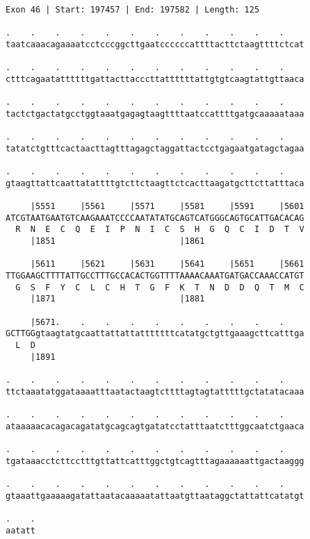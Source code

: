\documentclass{article}
\begin{document}
\begin{Verbatim}
Exon 46 | Start: 197457 | End: 197582 | Length: 125
 
.    .    .    .    .    .    .    .    .    .    .    .    
taatcaaacagaaaatcctcccggcttgaatccccccattttacttctaagttttctcat
  
.    .    .    .    .    .    .    .    .    .    .    .    
ctttcagaatattttttgattacttacccttattttttattgtgtcaagtattgttaaca
  
.    .    .    .    .    .    .    .    .    .    .    .    
tactctgactatgcctggtaaatgagagtaagttttaatccattttgatgcaaaaataaa
  
.    .    .    .    .    .    .    .    .    .    .    .    
tatatctgtttcactaacttagtttagagctaggattactcctgagaatgatagctagaa
  
.    .    .    .    .    .    .    .    .    .    .    .    
gtaagttattcaattatattttgtcttctaagttctcacttaagatgcttcttatttaca
  
     |5551     |5561     |5571     |5581     |5591     |5601
ATCGTAATGAATGTCAAGAAATCCCCAATATATGCAGTCATGGGCAGTGCATTGACACAG
  R  N  E  C  Q  E  I  P  N  I  C  S  H  G  Q  C  I  D  T  V
     |1851                         |1861                    
  
     |5611     |5621     |5631     |5641     |5651     |5661
TTGGAAGCTTTTATTGCCTTTGCCACACTGGTTTTAAAACAAATGATGACCAAACCATGT
  G  S  F  Y  C  L  C  H  T  G  F  K  T  N  D  D  Q  T  M  C
     |1871                         |1881                    
  
     |5671.    .    .    .    .    .    .    .    .    .    
GCTTGGgtaagtatgcaattattattatttttttcatatgctgttgaaagcttcatttga
  L  D                                                      
     |1891                                                  
  
.    .    .    .    .    .    .    .    .    .    .    .    
ttctaaatatggataaaatttaatactaagtcttttagtagtatttttgctatatacaaa
  
.    .    .    .    .    .    .    .    .    .    .    .    
ataaaaacacagacagatatgcagcagtgatatcctatttaatctttggcaatctgaaca
  
.    .    .    .    .    .    .    .    .    .    .    .    
tgataaacctcttcctttgttattcatttggctgtcagtttagaaaaaattgactaaggg
  
.    .    .    .    .    .    .    .    .    .    .    .    
gtaaattgaaaaagatattaatacaaaaatattaatgttaataggctattattcatatgt
  
.    .
aatatt
\end{Verbatim}
\newpage
\end{document}

